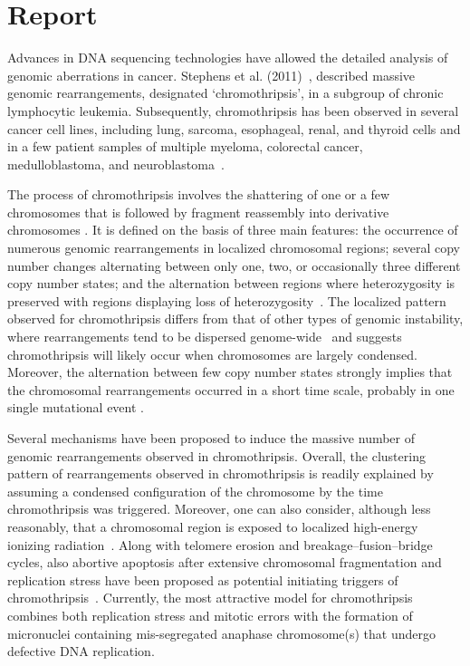 \section*{Report}
Advances in DNA sequencing technologies have allowed the detailed analysis of genomic aberrations in cancer. Stephens et al. (2011)~\cite{stephens2011massive}, described massive genomic rearrangements, designated ‘chromothripsis’, in a subgroup of chronic lymphocytic leukemia. Subsequently, chromothripsis has been observed in several cancer cell lines, including lung, sarcoma, esophageal, renal, and thyroid cells and in a few patient samples of multiple myeloma, colorectal cancer, medulloblastoma, and neuroblastoma~\cite{magrangeas2011chromothripsis,kloosterman2011chromothripsis,rausch2012genome,molenaar2012sequencing}.

The process of chromothripsis involves the shattering of one or a few chromosomes that is followed by fragment reassembly into derivative chromosomes
\cite{maher2012chromothripsis}. It is defined on the basis of three main features: the occurrence of numerous genomic rearrangements in localized chromosomal
regions; several copy number changes alternating between only one, two, or occasionally three different copy number states; and the alternation between
regions where heterozygosity is preserved with regions displaying loss of heterozygosity~\cite{maher2012chromothripsis}. The localized pattern observed for
chromothripsis differs from that of other types of genomic instability, where rearrangements tend to be dispersed genome-wide~\cite{campbell2008identification,stephens2009complex} and suggests chromothripsis will likely occur when chromosomes are largely condensed. Moreover, the alternation between few copy
number states strongly implies that the chromosomal rearrangements occurred in a short time scale, probably in one single mutational event
\cite{stephens2011massive, righolt2012shattered}.

Several mechanisms have been proposed to induce the massive number of genomic rearrangements observed in chromothripsis. Overall, the clustering
pattern of rearrangements observed in chromothripsis is readily explained by assuming a condensed configuration of the chromosome by the time
chromothripsis was triggered. Moreover, one can also consider, although less reasonably, that a chromosomal region is exposed to localized high-energy
ionizing radiation~\cite{misteli2007beyond}. Along with telomere erosion and breakage–fusion–bridge cycles, also abortive apoptosis after extensive chromosomal
fragmentation and replication stress have been proposed as potential initiating triggers of chromothripsis~\cite{jones2012chromothripsis}.
Currently, the most attractive model for chromothripsis combines both replication stress and mitotic errors with the formation of micronuclei containing
mis-segregated anaphase chromosome(s) that undergo defective DNA replication.

